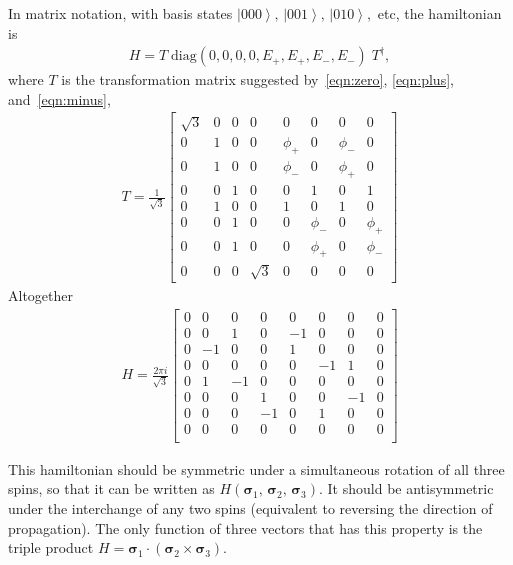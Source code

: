\documentclass[11pt]{article}
\renewcommand{\th}[1]{\frac{1}{#1}}
\newcommand{\ket}[1]{\left|#1\right\rangle}
\begin{document}
In matrix notation, with basis states $\ket{000},\,\ket{001},\,\ket{010},$ etc, the hamiltonian is 
\begin{align}
H = T\; \text{diag}(0,0,0,0,E_+,E_+,E_-,E_-)\; T^\dag,
\end{align}
where $T$ is the transformation matrix suggested by~\ref{eqn:zero}, \ref{eqn:plus}, and~\ref{eqn:minus},
\begin{align}
T = \th{\sqrt{3}}\begin{bmatrix}
	\sqrt{3} & 0 & 0 & 0        & 0      & 0      & 0      & 0      \\
	0        & 1 & 0 & 0        & \phi_+ & 0      & \phi_- & 0      \\
	0        & 1 & 0 & 0        & \phi_- & 0      & \phi_+ & 0      \\
	0        & 0 & 1 & 0        & 0      & 1      & 0      & 1      \\
	0        & 1 & 0 & 0        & 1      & 0      & 1      & 0      \\
	0        & 0 & 1 & 0        & 0      & \phi_- & 0      & \phi_+ \\
	0        & 0 & 1 & 0        & 0      & \phi_+ & 0      & \phi_- \\
	0        & 0 & 0 & \sqrt{3} & 0      & 0      & 0      & 0
	\end{bmatrix}
\end{align}
Altogether
\begin{align}
H = \frac{2\pi i}{\sqrt{3}}\begin{bmatrix}
	0 & 0  & 0  & 0  & 0  & 0  & 0  & 0 \\
	0 & 0  & 1  & 0  & -1 & 0  & 0  & 0 \\
	0 & -1 & 0  & 0  & 1  & 0  & 0  & 0 \\
	0 & 0  & 0  & 0  & 0  & -1 & 1  & 0 \\
	0 & 1  & -1 & 0  & 0  & 0  & 0  & 0 \\
	0 & 0  & 0  & 1  & 0  & 0  & -1 & 0 \\
	0 & 0  & 0  & -1 & 0  & 1  & 0  & 0 \\
	0 & 0  & 0  & 0  & 0  & 0  & 0  & 0 \\
	\end{bmatrix}
\end{align}

This hamiltonian should be symmetric under a simultaneous rotation of all three spins, so that it can be written as $H(\bm{\sigma}_1,\,\bm{\sigma}_2 ,\,\bm{\sigma}_3)$. It should be antisymmetric under the interchange of any two spins (equivalent to reversing the direction of propagation). The only function of three vectors that has this property is the triple product $H = \bm{\sigma}_1\cdot\left(\bm{\sigma}_2 \times\bm{\sigma}_3\right)$.
\end{document}

